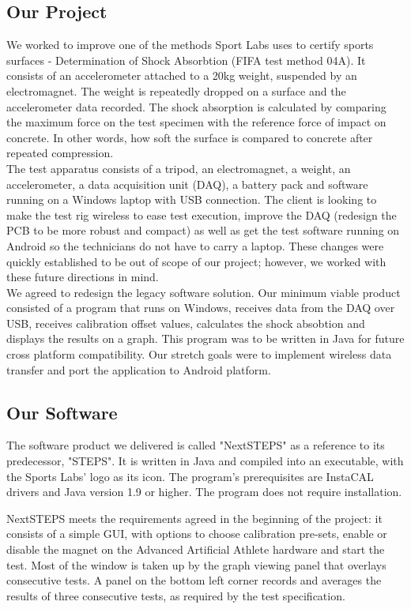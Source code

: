 \documentclass{l3proj}
\begin{document}
\subsection{Our Project}
We worked to improve one of the methods Sport Labs uses to certify sports surfaces - Determination of Shock Absorbtion (FIFA test method 04A). It consists of an accelerometer attached to a 20kg weight, suspended by an electromagnet. The weight is repeatedly dropped on a surface and the accelerometer data recorded. The shock absorption is calculated by comparing the maximum force on the test specimen with the reference force of impact on concrete\cite{fifa}. In other words, how soft the surface is compared to concrete after repeated compression. \\
The test apparatus consists of a tripod, an electromagnet, a weight, an accelerometer, a data acquisition unit (DAQ), a battery pack and software running on a Windows laptop with USB connection. The client is looking to make the test rig wireless to ease test execution, improve the DAQ (redesign the PCB to be more robust and compact) as well as get the test software running on Android so the technicians do not have to carry a laptop. These changes were quickly established to be out of scope of our project; however, we worked with these future directions in mind. \\
We agreed to redesign the legacy software solution. Our minimum viable product consisted of a program that runs on Windows, receives data from the DAQ over USB, receives calibration offset values, calculates the shock absobtion and displays the results on a graph. This program was to be written in Java for future cross platform compatibility. Our stretch goals were to implement wireless data transfer and port the application to Android platform.


\subsection{Our Software}
The software product we delivered is called "NextSTEPS" as a reference to its predecessor, "STEPS". It is written in Java and compiled into an executable, with the Sports Labs' logo as its icon. The program's prerequisites are InstaCAL drivers and Java version 1.9 or higher. The program does not require installation.

NextSTEPS meets the requirements agreed in the beginning of the project: it consists of a simple GUI, with options to choose calibration pre-sets, enable or disable the magnet on the Advanced Artificial Athlete hardware and start the test. Most of the window is taken up by the graph viewing panel that overlays consecutive tests. A panel on the bottom left corner records and averages the results of three consecutive tests, as required by the test specification\cite{fifa}.
\end{document}
